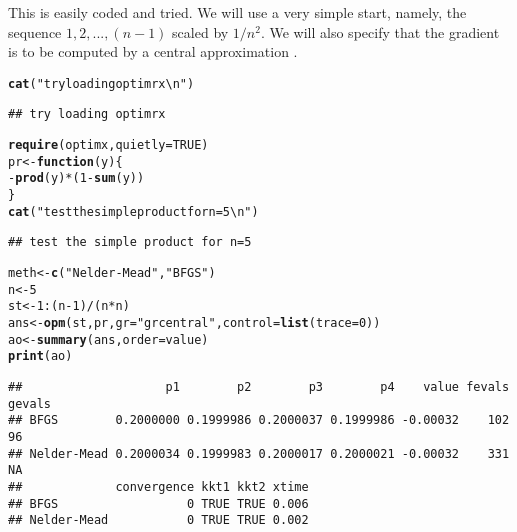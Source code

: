 \documentclass[11pt]{article}\usepackage[]{graphicx}\usepackage[]{color}
\makeatletter
\newcommand{\hlnum}[1]{\textcolor[rgb]{0.686,0.059,0.569}{#1}}%
\newcommand{\hlstr}[1]{\textcolor[rgb]{0.192,0.494,0.8}{#1}}%
\newcommand{\hlopt}[1]{\textcolor[rgb]{0,0,0}{#1}}%
\newcommand{\hlstd}[1]{\textcolor[rgb]{0.345,0.345,0.345}{#1}}%
\newcommand{\hlkwa}[1]{\textcolor[rgb]{0.161,0.373,0.58}{\textbf{#1}}}%
\newcommand{\hlkwb}[1]{\textcolor[rgb]{0.69,0.353,0.396}{#1}}%
\newcommand{\hlkwc}[1]{\textcolor[rgb]{0.333,0.667,0.333}{#1}}%
\newcommand{\hlkwd}[1]{\textcolor[rgb]{0.737,0.353,0.396}{\textbf{#1}}}%
\newenvironment{kframe}{%
 \def\at@end@of@kframe{}%
 \ifinner\ifhmode%
  \def\at@end@of@kframe{\end{minipage}}%
  \begin{minipage}{\columnwidth}%
 \fi\fi%
 \def\FrameCommand##1{\hskip\@totalleftmargin \hskip-\fboxsep
 \colorbox{shadecolor}{##1}\hskip-\fboxsep
     \hskip-\linewidth \hskip-\@totalleftmargin \hskip\columnwidth}%
 \MakeFramed {\advance\hsize-\width
   \@totalleftmargin\z@ \linewidth\hsize
   \@setminipage}}%
 {\par\unskip\endMakeFramed%
 \at@end@of@kframe}
\newenvironment{knitrout}{}{} %
\makeatother
\begin{document}
\vspace*{10pt}
This is easily coded and tried. We will use a very simple start, namely, the sequence $1,2, ...,
(n-1)$ scaled by $1/n^2$. We will also specify that the gradient is to be computed by a 
central approximation \citep{optextras}.

\begin{knitrout}\scriptsize
{}\color{fgcolor}\begin{kframe}
\begin{alltt}
\hlkwd{cat}\hlstd{(}\hlstr{"try loading optimrx\textbackslash{}n"}\hlstd{)}
\end{alltt}
\begin{verbatim}
## try loading optimrx
\end{verbatim}
\begin{alltt}
\hlkwd{require}\hlstd{(optimx,} \hlkwc{quietly}\hlstd{=}\hlnum{TRUE}\hlstd{)}
\hlstd{pr} \hlkwb{<-} \hlkwa{function}\hlstd{(}\hlkwc{y}\hlstd{) \{}
\hlopt{-} \hlkwd{prod}\hlstd{(y)}\hlopt{*}\hlstd{(}\hlnum{1}\hlopt{-}\hlkwd{sum}\hlstd{(y))}
\hlstd{\}}
\hlkwd{cat}\hlstd{(}\hlstr{"test the simple product for n=5\textbackslash{}n"}\hlstd{)}
\end{alltt}
\begin{verbatim}
## test the simple product for n=5
\end{verbatim}
\begin{alltt}
\hlstd{meth} \hlkwb{<-} \hlkwd{c}\hlstd{(}\hlstr{"Nelder-Mead"}\hlstd{,} \hlstr{"BFGS"}\hlstd{)}
\hlstd{n}\hlkwb{<-}\hlnum{5}
  \hlstd{st}\hlkwb{<-}\hlnum{1}\hlopt{:}\hlstd{(n}\hlopt{-}\hlnum{1}\hlstd{)}\hlopt{/}\hlstd{(n}\hlopt{*}\hlstd{n)}
   \hlstd{ans}\hlkwb{<-}\hlkwd{opm}\hlstd{(st, pr,} \hlkwc{gr}\hlstd{=}\hlstr{"grcentral"}\hlstd{,} \hlkwc{control}\hlstd{=}\hlkwd{list}\hlstd{(}\hlkwc{trace}\hlstd{=}\hlnum{0}\hlstd{))}
   \hlstd{ao}\hlkwb{<-}\hlkwd{summary}\hlstd{(ans,}\hlkwc{order}\hlstd{=value)}
\hlkwd{print}\hlstd{(ao)}
\end{alltt}
\begin{verbatim}
##                    p1        p2        p3        p4    value fevals gevals
## BFGS        0.2000000 0.1999986 0.2000037 0.1999986 -0.00032    102     96
## Nelder-Mead 0.2000034 0.1999983 0.2000017 0.2000021 -0.00032    331     NA
##             convergence kkt1 kkt2 xtime
## BFGS                  0 TRUE TRUE 0.006
## Nelder-Mead           0 TRUE TRUE 0.002
\end{verbatim}
\end{kframe}
\end{knitrout}
\end{document}
